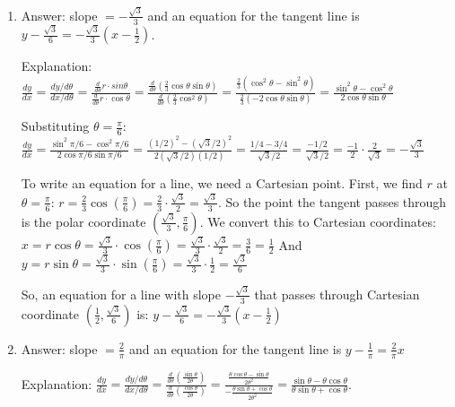 \begin{Answer}[ref = polar3]
\begin{enumerate}
\item Answer: slope $ = -\frac{\sqrt{3}}{3}$ and an equation for the tangent 
line is $y - \frac{\sqrt{3}}{6} = -\frac{\sqrt{3}}{3} \left( x - \frac{1}{2} 
\right)$. 

Explanation: $\frac{dy}{dx} = \frac{dy/d\theta}{dx/d\theta} = \frac{\frac{d}{d
\theta}r \cdot sin{\theta}}{\frac{d}{d\theta} r \cdot \cos{\theta}} = \frac{
\frac{d}{d\theta} \left( \frac{2}{3} \cos{\theta} \sin{\theta} \right)}{\frac{
d}{d\theta} \left( \frac{2}{3} \cos^2{\theta} \right)} = \frac{\frac{2}{3} 
\left( \cos^2{\theta} -\sin^2{\theta} \right)}{\frac{2}{3} \left( -2\cos{
\theta}\sin{\theta}\right)} = \frac{\sin^2{\theta} - \cos^2{\theta}}{2\cos{
\theta}\sin{\theta}}$

Substituting $\theta = \frac{\pi}{6}$: $\frac{dy}{dx} = \frac{\sin^2{\pi/6} - 
\cos^2{\pi/6}}{2\cos{\pi/6}\sin{\pi/6}} = \frac{\left(1/2 \right)^2 - \left(
\sqrt{3}/2\right)^2}{2\left(\sqrt{3}/2\right) \left(1/2\right)} = \frac{1/4 - 
3/4}{\sqrt{3}/2} = \frac{-1/2}{\sqrt{3}/2} = \frac{-1}{2} \cdot \frac{2}{\sqrt{
3}} = -\frac{\sqrt{3}}{3}$

To write an equation for a line, we need a Cartesian point. First, we find $r$ 
at $\theta = \frac{\pi}{6}$: $r = \frac{2}{3}\cos{\left( \frac{\pi}{6} \right)}
= \frac{2}{3} \cdot \frac{\sqrt{3}}{2} = \frac{\sqrt{3}}{3}$. So the point the 
tangent passes through is the polar coordinate $\left( \frac{\sqrt{3}}{3}, 
\frac{\pi}{6} \right)$. We convert this to Cartesian coordinates: $x = r \cos{
\theta} = \frac{\sqrt{3}}{3} \cdot \cos{\left( \frac{\pi}{6} \right)} = \frac{
\sqrt{3}}{3} \cdot \frac{\sqrt{3}}{2} = \frac{3}{6} = \frac{1}{2}$ And $y = r
\sin{\theta} = \frac{\sqrt{3}}{3} \cdot \sin{\left( \frac{\pi}{6} \right)} = 
\frac{\sqrt{3}}{3} \cdot \frac{1}{2} = \frac{\sqrt{3}}{6}$

So, an equation for a line with slope $-\frac{\sqrt{3}}{3}$ that passes 
through Cartesian coordinate $\left( \frac{1}{2}, \frac{\sqrt{3}}{6} \right)$ 
is: $y - \frac{\sqrt{3}}{6} = -\frac{\sqrt{3}}{3} \left( x - \frac{1}{2} 
\right)$

\item Answer: slope $= \frac{2}{\pi}$ and an equation for the tangent line is 
$y - \frac{1}{\pi} = \frac{2}{\pi}x$

Explanation: $\frac{dy}{dx} = \frac{dy/d\theta}{dx/d\theta} = \frac{\frac{d}{d
\theta} \left( \frac{\sin{\theta}}{2\theta}\right)}{\frac{d}{d\theta} \left( 
\frac{\cos{\theta}}{2\theta}\right)} = \frac{\frac{\theta \cos{\theta} - \sin{
\theta}}{2\theta^2}}{-\frac{\theta\sin{\theta} + \cos{\theta}}{2\theta^2}} = 
\frac{\sin{\theta} - \theta\cos{\theta}}{\theta\sin{\theta} + \cos{\theta}}$. 


\end{enumerate}
\end{Answer}
